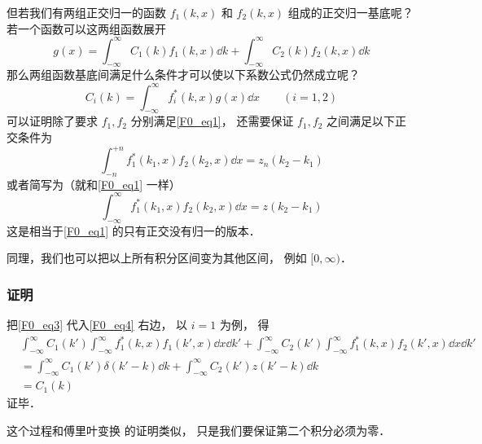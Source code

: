 但若我们有两组正交归一的函数 $f_1(k, x)$ 和 $f_2(k, x)$ 组成的正交归一基底呢？ 若一个函数可以这两组函数展开
\begin{equation}\label{F0_eq3}
g(x) = \int_{-\infty}^{\infty} C_1(k) f_1(k, x) \dd{k} + \int_{-\infty}^{\infty} C_2(k) f_2(k, x) \dd{k}
\end{equation}
那么两组函数基底间满足什么条件才可以使以下系数公式仍然成立呢？
\begin{equation}\label{F0_eq4}
C_i(k) = \int_{-\infty}^{\infty} f_i^*(k, x)g(x)\dd{x} \qquad (i = 1,2)
\end{equation}
可以证明除了要求 $f_1, f_2$ 分别满足\autoref{F0_eq1}， 还需要保证 $f_1, f_2$ 之间满足以下正交条件为
\begin{equation}
\int_{-n}^{+n} f_1^*(k_1, x) f_2(k_2, x) \dd{x} = z_n(k_2 - k_1)
\end{equation}
或者简写为（就和\autoref{F0_eq1} 一样）
\begin{equation}
\int_{-\infty}^{\infty} f_1^*(k_1, x) f_2(k_2, x) \dd{x} = z(k_2 - k_1)
\end{equation}
这是相当于\autoref{F0_eq1} 的只有正交没有归一的版本．

同理，我们也可以把以上所有积分区间变为其他区间， 例如 $[0, \infty)$．

\subsubsection{证明}
把\autoref{F0_eq3} 代入\autoref{F0_eq4} 右边， 以 $i = 1$ 为例， 得
\begin{equation}
\begin{aligned}
&\int_{-\infty}^{\infty} C_1(k') \int_{-\infty}^{\infty} f_1^*(k, x) f_1(k', x)\dd{x} \dd{k'} + \int_{-\infty}^{\infty} C_2(k') \int_{-\infty}^{\infty} f_1^*(k, x)f_2(k', x)\dd{x} \dd{k'}\\
&= \int_{-\infty}^{\infty} C_1(k') \delta(k' - k) \dd{k} + \int_{-\infty}^{\infty} C_2(k') z(k' - k) \dd{k}\\
&= C_1(k)
\end{aligned}
\end{equation}
证毕．

这个过程和傅里叶变换 的证明类似， 只是我们要保证第二个积分必须为零．
